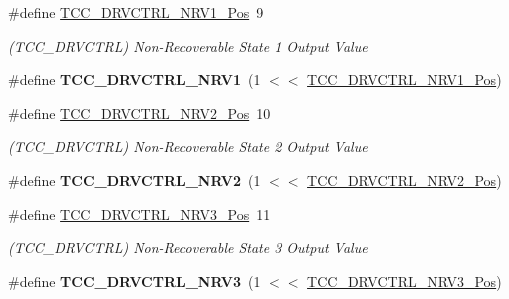 \begin{DoxyCompactItemize}
\item 
\hypertarget{group___s_a_m_l21___t_c_c_ga872ef8d1a200e5b8626c25de777ef647}{}\#define \hyperlink{group___s_a_m_l21___t_c_c_ga872ef8d1a200e5b8626c25de777ef647}{T\+C\+C\+\_\+\+D\+R\+V\+C\+T\+R\+L\+\_\+\+N\+R\+V1\+\_\+\+Pos}~9\label{group___s_a_m_l21___t_c_c_ga872ef8d1a200e5b8626c25de777ef647}

\begin{DoxyCompactList}\small\item\em (T\+C\+C\+\_\+\+D\+R\+V\+C\+T\+R\+L) Non-\/\+Recoverable State 1 Output Value \end{DoxyCompactList}\item 
\hypertarget{group___s_a_m_l21___t_c_c_gaa6b437a6efb5bce560f6f59e64219d10}{}\#define {\bfseries T\+C\+C\+\_\+\+D\+R\+V\+C\+T\+R\+L\+\_\+\+N\+R\+V1}~(1 $<$$<$ \hyperlink{group___s_a_m_l21___t_c_c_ga872ef8d1a200e5b8626c25de777ef647}{T\+C\+C\+\_\+\+D\+R\+V\+C\+T\+R\+L\+\_\+\+N\+R\+V1\+\_\+\+Pos})\label{group___s_a_m_l21___t_c_c_gaa6b437a6efb5bce560f6f59e64219d10}

\item 
\hypertarget{group___s_a_m_l21___t_c_c_gacdf782c4fab2d1d4d70c1975e93aac0a}{}\#define \hyperlink{group___s_a_m_l21___t_c_c_gacdf782c4fab2d1d4d70c1975e93aac0a}{T\+C\+C\+\_\+\+D\+R\+V\+C\+T\+R\+L\+\_\+\+N\+R\+V2\+\_\+\+Pos}~10\label{group___s_a_m_l21___t_c_c_gacdf782c4fab2d1d4d70c1975e93aac0a}

\begin{DoxyCompactList}\small\item\em (T\+C\+C\+\_\+\+D\+R\+V\+C\+T\+R\+L) Non-\/\+Recoverable State 2 Output Value \end{DoxyCompactList}\item 
\hypertarget{group___s_a_m_l21___t_c_c_gac3335e72e08d2d99289946b36546d758}{}\#define {\bfseries T\+C\+C\+\_\+\+D\+R\+V\+C\+T\+R\+L\+\_\+\+N\+R\+V2}~(1 $<$$<$ \hyperlink{group___s_a_m_l21___t_c_c_gacdf782c4fab2d1d4d70c1975e93aac0a}{T\+C\+C\+\_\+\+D\+R\+V\+C\+T\+R\+L\+\_\+\+N\+R\+V2\+\_\+\+Pos})\label{group___s_a_m_l21___t_c_c_gac3335e72e08d2d99289946b36546d758}

\item 
\hypertarget{group___s_a_m_l21___t_c_c_ga5a40bb9be748c24dafc2f0ca0639799a}{}\#define \hyperlink{group___s_a_m_l21___t_c_c_ga5a40bb9be748c24dafc2f0ca0639799a}{T\+C\+C\+\_\+\+D\+R\+V\+C\+T\+R\+L\+\_\+\+N\+R\+V3\+\_\+\+Pos}~11\label{group___s_a_m_l21___t_c_c_ga5a40bb9be748c24dafc2f0ca0639799a}

\begin{DoxyCompactList}\small\item\em (T\+C\+C\+\_\+\+D\+R\+V\+C\+T\+R\+L) Non-\/\+Recoverable State 3 Output Value \end{DoxyCompactList}\item 
\hypertarget{group___s_a_m_l21___t_c_c_gafd18f2a3d3782046f96c176fa7448664}{}\#define {\bfseries T\+C\+C\+\_\+\+D\+R\+V\+C\+T\+R\+L\+\_\+\+N\+R\+V3}~(1 $<$$<$ \hyperlink{group___s_a_m_l21___t_c_c_ga5a40bb9be748c24dafc2f0ca0639799a}{T\+C\+C\+\_\+\+D\+R\+V\+C\+T\+R\+L\+\_\+\+N\+R\+V3\+\_\+\+Pos})\label{group___s_a_m_l21___t_c_c_gafd18f2a3d3782046f96c176fa7448664}


\end{DoxyCompactItemize}
